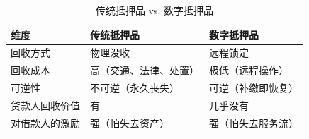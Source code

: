 \begin{table}
  \centering
  \caption{传统抵押品 vs. 数字抵押品}
  \label{tab:traditional_vs_digital_collateral}  %
  {\begin{tabular}{lll}
    \toprule
    \textbf{维度} & \textbf{传统抵押品} & \textbf{数字抵押品} \\
    \midrule
    回收方式 & 物理没收 & 远程锁定 \\
    回收成本 & 高（交通、法律、处置） & 极低（远程操作） \\
    可逆性 & 不可逆（永久丧失） & 可逆（补缴即恢复） \\
    \rowcolor{yellow!30}
    贷款人回收价值 & 有 & 几乎没有 \\
    对借款人的激励 & 强（怕失去资产） & 强（怕失去服务流） \\
    \bottomrule
  \end{tabular}}
\end{table}
